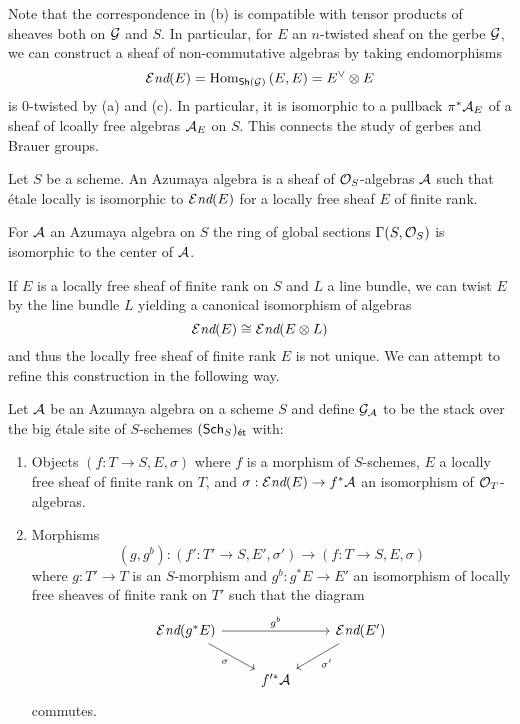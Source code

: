 Note that the correspondence in  (b) is compatible with tensor products of sheaves both on $\mathcal{G}$ and $S$. In particular, for $E$ an $n$-twisted sheaf on the gerbe $\mathcal{G}$, we can construct a sheaf of non-commutative algebras by taking endomorphisms 
$$\operatorname{\mathcal{E}\emph{nd}}(E)=\mathrm{Hom}_{\mathsf{Sh}(\mathcal{G})}\left(E,E\right)=E^{\vee}\otimes E$$
is 0-twisted by  (a) and (c). In particular, it is isomorphic to a pullback $\pi^{*}\mathcal{A}_{E}$ of a sheaf of lcoally free algebras $\mathcal{A}_{E}$ on $S$. This connects the study of gerbes and Brauer groups. 
\begin{definition}\label{def: Azumaya algebra}
    Let $S$ be a scheme. An Azumaya algebra is a sheaf of $\mathcal{O}_{S}$-algebras $\mathcal{A}$ such that \'{e}tale locally is isomorphic to $\operatorname{\mathcal{E}\emph{nd}}(E)$ for a locally free sheaf $E$ of finite rank. 
\end{definition}
\begin{remark}
    For $\mathcal{A}$ an Azumaya algebra on $S$ the ring of global sections $\Gamma(S,\mathcal{O}_{S})$ is isomorphic to the center of $\mathcal{A}$. 
\end{remark}
If $E$ is a locally free sheaf of finite rank on $S$ and $L$ a line bundle, we can twist $E$ by the line bundle $L$ yielding a canonical isomorphism of algebras 
$$\operatorname{\mathcal{E}\emph{nd}}(E)\cong\operatorname{\mathcal{E}\emph{nd}}(E\otimes L)$$
and thus the locally free sheaf of finite rank $E$ is not unique. We can attempt to refine this construction in the following way. 
\begin{definition}\label{def: stack of Azumaya algebras}
    Let $\mathcal{A}$ be an Azumaya algebra on a scheme $S$ and define $\mathcal{G}_{\mathcal{A}}$ to be the stack over the big \'{e}tale site of $S$-schemes $(\mathsf{Sch}_{S})_{\mathsf{\acute{e}t}}$ with:
    \begin{enumerate}[label=(\alph*)]
        \item Objects $(f:T\to S, E, \sigma)$ where $f$ is a morphism of $S$-schemes, $E$ a locally free sheaf of finite rank on $T$, and  $\sigma:\operatorname{\mathcal{E}\emph{nd}}(E)\to f^{*}\mathcal{A}$ an isomorphism of $\mathcal{O}_{T}$-algebras. 
        \item Morphisms 
        $$(g,g^{b}):(f':T'\to S, E',\sigma')\longrightarrow (f:T\to S, E, \sigma)$$
        where $g:T'\to T$ is an $S$-morphism and $g^{b}:g^{*}E\to E'$ an isomorphism of locally free sheaves of finite rank on $T'$ such that the diagram 
        $$%
        \begin{tikzcd}
            {\sheafEnd(g^{*}E)} && {\sheafEnd(E')} \\
            & {f'^{*}\Acal}
            \arrow["\sigma"', from=1-1, to=2-2]
            \arrow["{\sigma'}", from=1-3, to=2-2]
            \arrow["{g^{b}}", from=1-1, to=1-3]
        \end{tikzcd}$$
        commutes. 
    \end{enumerate}
\end{definition}
